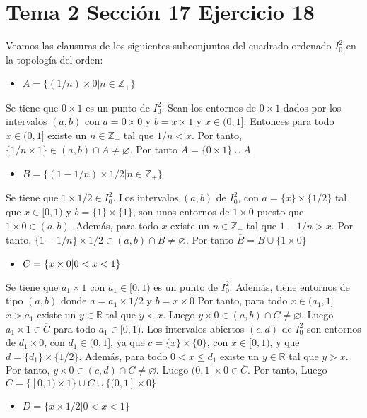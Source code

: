 \documentclass{article}
\begin{document}
\section{Tema 2 Sección 17 Ejercicio 18}
Veamos las clausuras de los siguientes subconjuntos del cuadrado ordenado $I^2_0$ en la topología del orden:
\begin{itemize}
\item $A=\{(1/n)\times 0|n\in \mathbb{Z}_+\}$
\end{itemize}
Se tiene que $0\times 1$ es un punto de $I^2_0$. Sean los entornos de $0\times 1$ dados por los intervalos $(a,b)$ con $a=0\times 0$ y $b=x\times 1$ y $x\in (0,1]$. Entonces para todo $x\in (0,1]$ existe un $n\in \mathbb{Z}_+$ tal que $1/n<x$. Por tanto, $\{1/n \times 1\}\in (a,b)\cap  A\neq\varnothing$. Por tanto $\overline{A}=\{0\times 1\}\cup A$
\begin{itemize}
\item $B=\{(1-1/n)\times 1/2|n\in \mathbb{Z}_+\}$
\end{itemize}
Se tiene que $1\times 1/2\in I^2_0$. Los intervalos $(a,b)$ de $I^2_0$, con $a=\{x\}\times \{1/2\}$ tal que $x\in [0,1)$ y $b=\{1\}\times \{1\}$, son unos entornos de  $1\times 0$ puesto que $1\times 0\in (a,b)$. Además, para todo $x$ existe un $n\in \mathbb{Z}_+$ tal que $1-1/n>x$. Por tanto, $\{1-1/n\}\times 1/2\in (a,b) \cap  B \neq\varnothing$. Por tanto $\overline{B}= B\cup \{1\times 0\}$
\begin{itemize}
\item $C=\{x\times 0|\space 0<x<1\}$
\end{itemize}
Se tiene que $a_1\times 1$ con $a_1\in [0,1)$ es un punto de  $I^2_0$. Además, tiene entornos de tipo $(a,b)$ donde $a=a_1\times 1/2$ y $b=x\times 0$ Por tanto, para todo $x\in (a_1,1]$ $x > a_1$ existe un $y\in \mathbb{R}$ tal que $y<x$. Luego $y\times 0\in (a,b)\cap C\neq \varnothing$. Luego $a_1\times 1\in \overline{C}$ para todo $a_1\in [0,1)$. Los intervalos abiertos $(c,d)$ de $I^2_0$ son entornos de $d_1\times 0$, con $d_1\in (0,1]$, ya que $c=\{x\}\times \{0\}$, con $x\in [0,1)$, y que $d =\{d_1\}\times \{1/2\}$. Además, para todo $0<x\leq d_1$ existe un $y\in \mathbb{R}$ tal que $y>x$. Por tanto, $y\times 0\in (c,d) \cap  C \neq\varnothing$. Luego $(0,1]\times 0\in \overline{C}$. Por tanto, Luego $\overline{C}=\{[0,1)\times 1\}\cup C\cup \{(0,1]\times 0\}$
\begin{itemize}
\item $D=\{x\times 1/2| 0<x<1\}$
\end{itemize}
\end{document}
